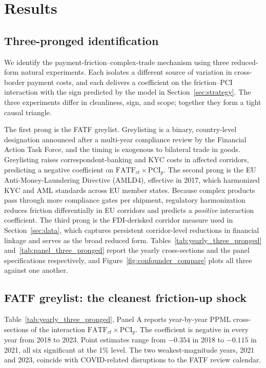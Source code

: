 \section{Results}
\label{sec:results}

\subsection{Three-pronged identification}
\label{subsec:three_pronged}

We identify the payment-friction--complex-trade mechanism using three reduced-form natural experiments. Each isolates a different source of variation in cross-border payment costs, and each delivers a coefficient on the friction--PCI interaction with the sign predicted by the model in Section~\ref{sec:strategy}. The three experiments differ in cleanliness, sign, and scope; together they form a tight causal triangle.

The first prong is the FATF greylist. Greylisting is a binary, country-level designation announced after a multi-year compliance review by the Financial Action Task Force, and the timing is exogenous to bilateral trade in goods. Greylisting raises correspondent-banking and KYC costs in affected corridors, predicting a negative coefficient on $\text{FATF}_{ct} \times \text{PCI}_p$. The second prong is the EU Anti-Money-Laundering Directive (AMLD4), effective in 2017, which harmonized KYC and AML standards across EU member states. Because complex products pass through more compliance gates per shipment, regulatory harmonization reduces friction differentially in EU corridors and predicts a \emph{positive} interaction coefficient. The third prong is the FDI-derisked corridor measure used in Section~\ref{sec:data}, which captures persistent corridor-level reductions in financial linkage and serves as the broad reduced form. Tables~\ref{tab:yearly_three_pronged} and~\ref{tab:panel_three_pronged} report the yearly cross-sections and the panel specifications respectively, and Figure~\ref{fig:confounder_compare} plots all three against one another.

\subsection{FATF greylist: the cleanest friction-up shock}
\label{subsec:fatf}

Table~\ref{tab:yearly_three_pronged}, Panel A reports year-by-year PPML cross-sections of the interaction $\text{FATF}_{ct} \times \text{PCI}_p$. The coefficient is negative in every year from 2018 to 2023. Point estimates range from $-0.354$ in 2018 to $-0.115$ in 2021, all six significant at the 1\% level. The two weakest-magnitude years, 2021 and 2023, coincide with COVID-related disruptions to the FATF review calendar.

